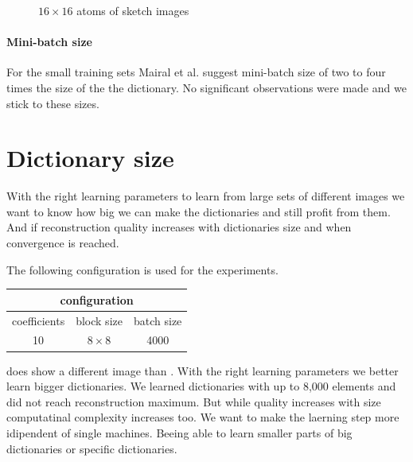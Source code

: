 \begin{figure}[h]
\centering
{}
\caption{$16\times 16$ atoms of sketch images}
\label{fig:sketch_atoms}
\end{figure}



\paragraph{Mini-batch size}
For the small training sets Mairal et al. suggest mini-batch size of two to four
times the size of the the dictionary. No significant observations were made
and we stick to these sizes. 

\clearpage

\section{Dictionary size}
With the right learning parameters to learn from large sets of
different images we want to know how big we can make the dictionaries and
still profit from them. And if reconstruction quality increases with
dictionaries size and when convergence is reached. 

The following configuration is used for the experiments. 
\begin{table}[H]
\centering
\begin{tabular}{| c | c | c |}
\hline
\multicolumn{3}{|c|}{configuration}\\
\hline
coefficients & block size & batch size \\
\hline
10 & $8\times 8$ & 4000  \\
\hline
\end{tabular}
\end{table}

 does show a different image than
. With the right learning parameters 
we better learn bigger dictionaries. We learned dictionaries with up to 8,000
elements and did not reach reconstruction maximum. But while quality increases
with size computatinal complexity increases too. We want to make the laerning
step more idipendent of single machines. Beeing able to learn smaller parts of
big dictionaries or specific dictionaries.


